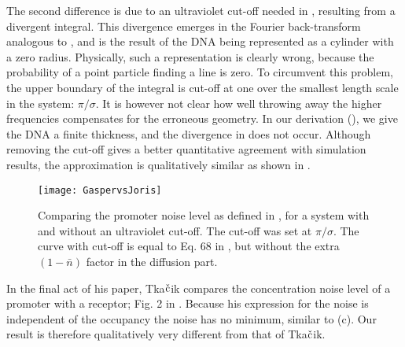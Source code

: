The second difference is due to an ultraviolet cut-off needed in \cite{Tkacik2009}, resulting from a divergent integral. This divergence emerges in the Fourier back-transform analogous to , and is the result of the DNA being represented as a cylinder with a zero radius. Physically, such a representation is clearly wrong, because the probability of a point particle finding a line is zero. To circumvent this problem, the upper boundary of the integral is cut-off at one over the smallest length scale in the system: $\pi/\sigma$. It is however not clear how well throwing away the higher frequencies compensates for the erroneous geometry. In our derivation (), we give the DNA a finite thickness, and the divergence in  does not occur. Although removing the cut-off gives a better quantitative agreement with simulation results, the approximation is qualitatively similar as shown in .
\begin{figure}
\centering
\texttt{[image: GaspervsJoris]}
\caption{ Comparing the promoter noise level as defined in , for a system with and without an ultraviolet cut-off. The cut-off was set at $\pi/\sigma$. The curve with cut-off is equal to Eq. 68 in \cite{Tkacik2009}, but without the extra $(1-\bar{n})$ factor in the diffusion part.}
\end{figure}

In the final act of his paper, Tka$\check{\rm c}$ik compares the concentration noise level of a promoter with a receptor; Fig. 2 in \cite{Tkacik2009}. Because his expression for the noise is independent of the occupancy the noise has no minimum, similar to  (c). Our result is therefore qualitatively very different from that of Tka$\check{\rm c}$ik.



